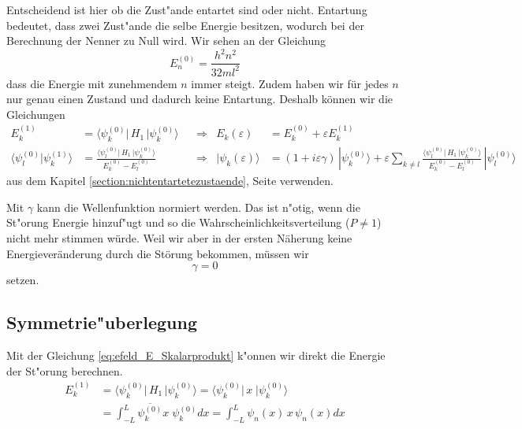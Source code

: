\begin{refsection}
Entscheidend ist hier ob die Zust"ande entartet sind oder nicht.
Entartung bedeutet, dass zwei Zust"ande die selbe Energie besitzen, 
wodurch bei der Berechnung der Nenner zu Null wird.
Wir sehen an der Gleichung
\[
  E_n^{(0)} = \frac{h^2n^2}{32ml^2}
\]
dass die Energie mit zunehmendem $n$ immer steigt. 
Zudem haben wir f\"ur jedes $n$ nur genau einen Zustand und dadurch keine Entartung. 
Deshalb k\"onnen wir die Gleichungen
\begin{equation}
\begin{aligned}
\label{eq:efeld_E_Skalarprodukt}
E_k^{(1)} &=
\langle \psi_k^{(0)}|\, H_1 \,|\psi_k^{(0)}\rangle
&&\Longrightarrow
& E_k(\varepsilon)&=E_k^{(0)} + \varepsilon E_k^{(1)}
\\
\langle\psi_l^{(0)}|\psi_k^{(1)}\rangle
&=
\frac{\langle \psi_l^{(0)}|\, H_1 \,|\psi_k^{(0)}\rangle}{E_k^{(0)}-E_l^{(0)}}
&&\Longrightarrow
& |\psi_k(\varepsilon)\rangle &=
(1+i\varepsilon \gamma)
\,|\psi_k^{(0)}\rangle
+
\varepsilon
\sum_{k\ne l}
\frac{\langle \psi_l^{(0)}|\, H_1 \,|\psi_k^{(0)}\rangle}{E_k^{(0)}-E_l^{(0)}}
\,
|\psi_l^{(0)}\rangle
\end{aligned}
\end{equation}
aus dem Kapitel \ref{section:nichtentartetezustaende}, Seite \pageref{section:nichtentartetezustaende} verwenden.

Mit $\gamma$ kann die Wellenfunktion normiert werden.
Das ist n"otig, wenn die St"orung Energie hinzuf"ugt
und so die Wahrscheinlichkeitsverteilung ($P \ne 1$) nicht mehr stimmen w\"urde.
Weil wir aber in der ersten N\"aherung keine 
Energiever\"anderung durch die St\"orung bekommen, m\"ussen wir
\begin{equation}
  \label{eq:efeld_gamma}
  \gamma = 0
\end{equation}
setzen.




\subsection{Symmetrie"uberlegung}
Mit der Gleichung \ref{eq:efeld_E_Skalarprodukt} k"onnen wir direkt die Energie der St"orung berechnen.
\begin{equation}
\begin{aligned}
  E_{k}^{(1)} 
 &= \langle \psi_k^{(0)}|\, H_1 \,|\psi_k^{(0)}\rangle 
  = \langle \psi_k^{(0)}|\, x \;|\psi_k^{(0)}\rangle                   \\
 &= \int_{-L}^{L} \overline{\psi_k^{(0)}} x \; \psi_k^{(0)} dx
  = \int_{-L}^{L} \psi_n(x) \, x \, \psi_n(x) dx
\end{aligned}
\end{equation}


\end{refsection}
